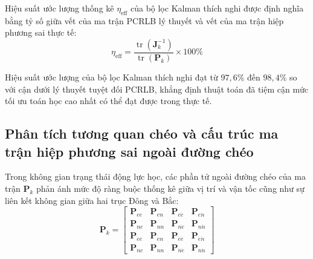 Hiệu suất ước lượng thống kê $\eta_{\text{eff}}$ của bộ lọc Kalman thích nghi được định nghĩa bằng tỷ số giữa vết của ma trận PCRLB lý thuyết và vết của ma trận hiệp phương sai thực tế:
\begin{equation}
\eta_{\text{eff}} = \frac{\operatorname{tr}(\mathbf{J}_k^{-1})}{\operatorname{tr}(\mathbf{P}_k)} \times 100\%
\label{eq:kalman-efficiency-ratio}
\end{equation}

\begin{table}[H]
\centering
\caption{Đối chiếu giữa giới hạn tối ưu lý thuyết PCRLB và hiệp phương sai Kalman thích nghi}
\label{tab:pcrlb-comparison-table}
\end{table}

Hiệu suất ước lượng của bộ lọc Kalman thích nghi đạt từ $97{,}6\%$ đến $98{,}4\%$ so với cận dưới lý thuyết tuyệt đối PCRLB, khẳng định thuật toán đã tiệm cận mức tối ưu toán học cao nhất có thể đạt được trong thực tế.

\subsection{Phân tích tương quan chéo và cấu trúc ma trận hiệp phương sai ngoài đường chéo}

\hspace{0.5cm} Trong không gian trạng thái động lực học, các phần tử ngoài đường chéo của ma trận $\mathbf{P}_k$ phản ánh mức độ ràng buộc thống kê giữa vị trí và vận tốc cũng như sự liên kết không gian giữa hai trục Đông và Bắc:
\begin{equation}
\mathbf{P}_k = \begin{bmatrix}
\mathbf{P}_{ee} & \mathbf{P}_{en} & \mathbf{P}_{e\dot{e}} & \mathbf{P}_{e\dot{n}} \\
\mathbf{P}_{ne} & \mathbf{P}_{nn} & \mathbf{P}_{n\dot{e}} & \mathbf{P}_{n\dot{n}} \\
\mathbf{P}_{\dot{e}e} & \mathbf{P}_{\dot{e}n} & \mathbf{P}_{\dot{e}\dot{e}} & \mathbf{P}_{\dot{e}\dot{n}} \\
\mathbf{P}_{\dot{n}e} & \mathbf{P}_{\dot{n}n} & \mathbf{P}_{\dot{n}\dot{e}} & \mathbf{P}_{\dot{n}\dot{n}}
\end{bmatrix}
\label{eq:full-covariance-matrix-structure}
\end{equation}


